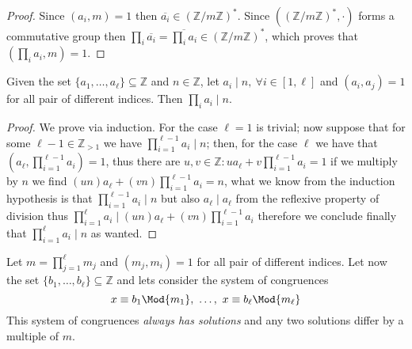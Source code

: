 \begin{proof}
   Since \((a_i, m) = 1\) then  \(\overline{a_i} \in
   (\mathbb{Z}/m\mathbb{Z})^\ast\). Since \(((\mathbb{Z}/m\mathbb{Z})^\ast,
   \cdot)\) forms a commutative group then \(\prod_{i} \overline{a_i} =
   \overline{\prod_i a_i} \in (\mathbb{Z}/m\mathbb{Z})^\ast\), which proves that
   \((\prod_i a_i, m) = 1\).
\end{proof}

\begin{lemma}\label{ChiRemLem2}
   Given the set \(\{a_1, \dots, a_\ell\} \subseteq \mathbb{Z}\) and \(n \in
   \mathbb{Z}\), let \(a_i \mid n,\ \forall i \in [1, \ell]\) and \((a_i, a_j) =
   1\) for all pair of different indices. Then  \(\prod_i a_i \mid n\).
\end{lemma}

\begin{proof}
   We prove via induction. For the case \(\ell = 1\) is trivial; now suppose
   that for some \(\ell-1 \in \mathbb{Z}_{>1}\) we have
   \(\prod_{i=1}^{\ell-1}a_i \mid n\); then, for the case \(\ell\) we have that
   \((a_\ell, \prod_{i=1}^{\ell-1} a_i)=1\), thus there are \(u, v \in
   \mathbb{Z} : u a_\ell + v\prod_{i=1}^{\ell-1}a_i = 1\) if we multiply by
   \(n\) we find \((un) a_\ell + (vn) \prod_{i=1}^{\ell-1} a_i = n\), what we
   know from the induction hypothesis is that \(\prod_{i=1}^{\ell-1}a_i \mid n\)
   but also \(a_\ell \mid a_\ell\) from the reflexive property of division thus
   \(\prod_{i=1}^\ell a_i \mid (un) a_\ell + (vn) \prod_{i=1}^{\ell-1} a_i\)
   therefore we conclude finally that \(\prod_{i=1}^\ell a_i \mid n\) as wanted.
\end{proof}

\begin{theorem}
   Let \(m = \prod_{j=1}^\ell m_j\) and \((m_j, m_i) = 1\) for all pair of
   different indices. Let now the set \(\{b_1, \dots, b_\ell\} \subseteq
   \mathbb{Z}\) and lets consider the system of congruences
   \[
      x \equiv b_1 \Mod{m_1},\ \dots,\ x \equiv b_\ell \Mod{m_\ell}
   \] 
   This system of congruences \emph{always has solutions} and any two solutions
   differ by a multiple of \(m\).
\end{theorem}

